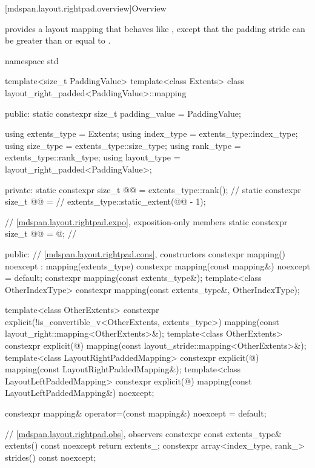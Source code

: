 [mdspan.layout.rightpad.overview]{Overview}

\pnum
{} provides a layout mapping
that behaves like ,
except that the padding stride 
can be greater than or equal to
.

\begin{codeblock}
namespace std {
  template<size_t PaddingValue>
  template<class Extents>
  class layout_right_padded<PaddingValue>::mapping {
  public:
    static constexpr size_t padding_value = PaddingValue;

    using extents_type = Extents;
    using index_type = extents_type::index_type;
    using size_type = extents_type::size_type;
    using rank_type = extents_type::rank_type;
    using layout_type = layout_right_padded<PaddingValue>;

  private:
    static constexpr size_t @@ = extents_type::rank();    // \expos
    static constexpr size_t @@ =             // \expos
      extents_type::static_extent(@@ - 1);

    // \ref{mdspan.layout.rightpad.expo}, exposition-only members
    static constexpr size_t @@ = @\seebelow@; // \expos

  public:
    // \ref{mdspan.layout.rightpad.cons}, constructors
    constexpr mapping() noexcept : mapping(extents_type{}) {}
    constexpr mapping(const mapping&) noexcept = default;
    constexpr mapping(const extents_type&);
    template<class OtherIndexType>
      constexpr mapping(const extents_type&, OtherIndexType);

    template<class OtherExtents>
      constexpr explicit(!is_convertible_v<OtherExtents, extents_type>)
        mapping(const layout_right::mapping<OtherExtents>&);
    template<class OtherExtents>
      constexpr explicit(@\seebelow@)
        mapping(const layout_stride::mapping<OtherExtents>&);
    template<class LayoutRightPaddedMapping>
      constexpr explicit(@\seebelow@)
        mapping(const LayoutRightPaddedMapping&);
    template<class LayoutLeftPaddedMapping>
      constexpr explicit(@\seebelow@)
        mapping(const LayoutLeftPaddedMapping&) noexcept;

    constexpr mapping& operator=(const mapping&) noexcept = default;

    // \ref{mdspan.layout.rightpad.obs}, observers
    constexpr const extents_type& extents() const noexcept { return extents_; }
    constexpr array<index_type, rank_> strides() const noexcept;

}}
\end{codeblock}
